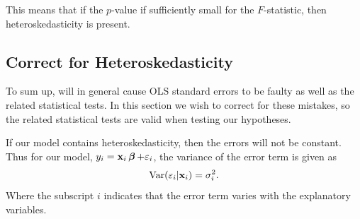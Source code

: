 This means that if the $p$-value if sufficiently small for the $F$-statistic, then heteroskedasticity is present. 















\subsection{Correct for Heteroskedasticity}
To sum up, \hetero will in general cause OLS standard errors to be faulty as well as the related statistical tests. In this section we wish to correct for these mistakes, so the related statistical tests are valid when testing our hypotheses. 

If our model contains heteroskedasticity, then the errors will not be constant. Thus for our model, $y_i = \textbf{x}_i\operatorname{\boldsymbol{\beta}} + \varepsilon_i$, the variance of the error term is given as
\begin{align*}
    \operatorname{\text{Var}}(\varepsilon_i | \mathbf{x}_i) = \sigma^2_i. 
\end{align*}
Where the subscript $i$ indicates that the error term varies with the explanatory variables. 

